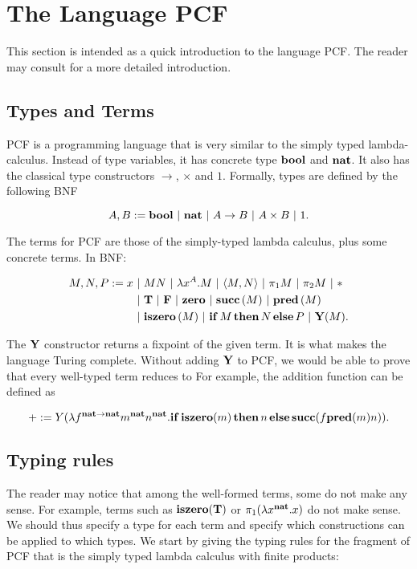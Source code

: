 
\section{The Language PCF}

This section is intended as a quick introduction to the language PCF. The reader may consult \cite{LambdaNotes} for a more detailed introduction.

\subsection{Types and Terms}

PCF is a programming language that is very similar to the simply typed lambda-calculus. Instead of type variables, it has concrete type $\mathbf{bool}$ and $\mathbf{nat}$. It also has the classical type constructors $\to$, $\times$ and $1$. Formally, types are defined by the following BNF

\[ A, B := \mathbf{bool} \ \mathbf{|}\  \mathbf{nat} \ \mathbf{|}\  A\to B \ \mathbf{|}\  A\times B \ \mathbf{|}\  1. \]

The terms for PCF are those of the simply-typed lambda calculus, plus some concrete terms. In BNF:

\begin{align*}
    M, N, P := x &\ \mathbf{|}\  MN \ \mathbf{|}\  \lambda x^A.M \ \mathbf{|}\  \langle M, N\rangle \ \mathbf{|}\  \pi_1M \ \mathbf{|}\  \pi_2M \ \mathbf{|}\  * \\
    &\ \mathbf{|}\  \mathbf{T} \ \mathbf{|}\  \mathbf{F} \ \mathbf{|}\  \mathbf{zero} \ \mathbf{|}\  \mathbf{succ}\,(M) \ \mathbf{|}\  \mathbf{pred}\,(M) \\
    &\ \mathbf{|}\  \mathbf{iszero}\,(M) \ \mathbf{|}\  \mathbf{if}\,M\,\mathbf{then}\,N\,\mathbf{else}\,P \ \mathbf{|}\  \mathbf{Y}(M).
\end{align*}

The $\mathbf{Y}$ constructor returns a fixpoint of the given term. It is what makes the language Turing complete. Without adding $\textbf{Y}$ to PCF, we would be able to prove that every well-typed term reduces to For example, the addition function can be defined as

\[ + := Y(\lambda f^{\mathbf{nat}\to\mathbf{nat}}m^\mathbf{nat}n^\mathbf{nat}.\mathbf{if}\,\mathbf{iszero}(m)\,\mathbf{then}\,n\,\mathbf{else }\,\mathbf{succ}(f \mathbf{pred}(m) n)). \]

\subsection{Typing rules}

The reader may notice that among the well-formed terms, some do not make any sense. For example, terms such as $\mathbf{iszero}(\mathbf{T})$ or $\pi_1(\lambda x^\mathbf{nat}.x)$ do not make sense. We should thus specify a type for each term and specify which constructions can be applied to which types. We start by giving the typing rules for the fragment of PCF that is the simply typed lambda calculus with finite products:


